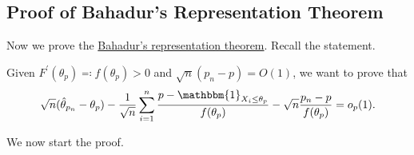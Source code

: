 \subsection{Proof of Bahadur's Representation Theorem}
Now we prove the \hyperref[thm:Bahadur-representation]{Bahadur's representation theorem}. Recall the statement.

\begin{prev}
	Given \(F^{\prime} (\theta _p) \eqqcolon f(\theta _p) > 0\) and \(\sqrt{n} (p_n - p) = O(1)\), we want to prove that
	\[
		\sqrt{n} (\hat{\theta} _{p_n} - \theta _p) - \frac{1}{\sqrt{n} } \sum_{i=1}^{n} \frac{p - \mathbbm{1}_{X_i \leq \theta _p} }{f(\theta _p)} - \sqrt{n} \frac{p_n - p}{f(\theta _p)} = o_p(1).
	\]
\end{prev}

We now start the proof.

